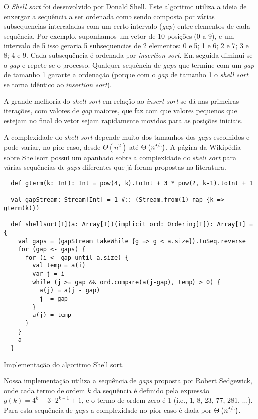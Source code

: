 \documentclass[a4paper,12pt]{scrartcl}
\begin{document}
O \emph{Shell sort} foi desenvolvido por Donald Shell. Este algoritmo utiliza a
ideia de enxergar a sequência a ser ordenada como sendo composta por várias
subsequencias intercaladas com um certo intervalo (\emph{gap}) entre elementos
de cada sequência. Por exemplo, suponhamos um vetor de 10 posições (0 a 9), e um
intervalo de 5 isso geraria 5 subsequencias de 2 elementos: 0 e 5; 1 e 6; 2 e 7;
3 e 8; 4 e 9. Cada subsequência é ordenada por \emph{insertion sort}. Em seguida
diminui-se o \emph{gap} e repete-se o processo. Qualquer sequência de
\emph{gaps} que termine com um \emph{gap} de tamanho 1 garante a ordenação
(porque com o \emph{gap} de tamanho 1 o \emph{shell sort} se torna idêntico ao
\emph{insertion sort}).

A grande melhoria do \emph{shell sort} em relação ao \emph{insert sort} se dá
nas primeiras iterações, com valores de \emph{gap} maiores, que faz com que
valores pequenos que estejam no final do vetor sejam rapidamente movidos para as
posições iniciais.

A complexidade do \emph{shell sort} depende muito dos tamanhos dos \emph{gaps}
escolhidos e pode variar, no pior caso, desde $\Theta\left(n^2\right)$ até
$\Theta\left(n^{\sfrac{4}{3}}\right)$. A página da Wikipédia sobre
\href{https://en.wikipedia.org/wiki/Shellsort}{Shellsort} possui um apanhado
sobre a complexidade do \emph{shell sort} para várias sequências de \emph{gaps}
diferentes que já foram propostas na literatura.

\begin{listing}
\begin{verbatim}
  def gterm(k: Int): Int = pow(4, k).toInt + 3 * pow(2, k-1).toInt + 1

  val gapStream: Stream[Int] = 1 #:: (Stream.from(1) map {k => gterm(k)})

  def shellsort[T](a: Array[T])(implicit ord: Ordering[T]): Array[T] = {
    val gaps = (gapStream takeWhile {g => g < a.size}).toSeq.reverse
    for (gap <- gaps) {
      for (i <- gap until a.size) {
        val temp = a(i)
        var j = i
        while (j >= gap && ord.compare(a(j-gap), temp) > 0) {
          a(j) = a(j - gap)
          j -= gap
        }
        a(j) = temp
      }
    }
    a
  }
\end{verbatim}
\caption{Implementação do algoritmo Shell sort.}
\label{lst:shellsort}
\end{listing}

Nossa implementação utiliza a sequência de \emph{gaps} proposta por Robert
Sedgewick, onde cada termo de ordem $k$ da sequência é definido pela expressão
$g(k) = 4^k + 3\cdot 2^{k-1}+1$, e o termo de ordem zero é 1 (i.e., 1, 8, 23,
77, 281, $\ldots$). Para esta sequência de \emph{gaps} a complexidade no pior
caso é dada por $\Theta\left( n^{\sfrac{4}{3}} \right)$.
\end{document}
